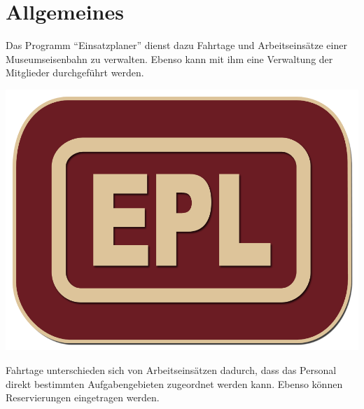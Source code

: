 \chapter{Allgemeines}

Das Programm "`Einsatzplaner"' dienst dazu Fahrtage und Arbeitseinsätze einer Museumseisenbahn zu verwalten.
Ebenso kann mit ihm eine Verwaltung der Mitglieder durchgeführt werden.

\begin{center}
  \includegraphics{../../Icon/keks.png}
\end{center}

Fahrtage unterschieden sich von Arbeitseinsätzen dadurch, dass das Personal direkt bestimmten Aufgabengebieten zugeordnet werden kann.
Ebenso können Reservierungen eingetragen werden.
